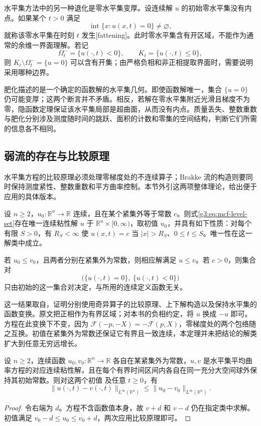 水平集方法中的另一种退化是零水平集变厚。设连续解 \(u\) 的初始零水平集没有内点。如果某个 \(t>0\) 满足
\[
\operatorname{int}\{x:u(x,t)=0\}\ne\varnothing,
\]
就称该零水平集在时刻 \(t\) 发生[fattening]。此时零水平集含有开区域，不能作为通常的余维一界面理解。若记
\[
\Omega_t^- =\{u(\cdot,t)<0\},\qquad K_t=\{u(\cdot,t)\le0\},
\]
则 \(K_t\setminus\Omega_t^-=\{u=0\}\) 可以含有开集；由严格负相和非正相提取界面时，需要说明采用哪种边界。

\ProseParagraphBreak
肥化描述的是一个确定的函数解的水平集几何。即使函数解唯一，集合 \(\{u=0\}\) 仍可能变厚；这两个断言并不矛盾。相反，若解在零水平集附近光滑且梯度不为零，隐函数定理保证该水平集局部是超曲面，从而没有内点。质量丢失、整数重数与肥化分别涉及测度随时间的跳跃、面积的计数和零集的空间结构，判断它们所需的信息各不相同。

\subsection{弱流的存在与比较原理}
\label{g3:subsec:2804:04}
水平集方程的比较原理必须处理零梯度处的不连续算子；Brakke 流的构造则要同时保持测度紧性、整数重数和平方曲率控制。本节外引这两项整体理论，给出便于应用的具体版本。

\begin{theorem}\label{g3:thm:level-set-global-external}
	设 \(n\ge2\)，\(u_0:\mathbb R^n\to\mathbb R\) 连续，且在某个紧集外等于常数 \(c\)。则式\eqref{g3:eq:mcf-level-set}存在唯一连续粘性解 \(u\) 于 \(\mathbb R^n\times[0,\infty)\)，取初值 \(u_0\)，并具有如下性质：对每个有限 \(S>0\)，有 \(R_S<\infty\) 使 \(u(x,t)=c\) 当 \(|x|>R_S\)、\(0\le t\le S\)。唯一性在这一解类中成立。

	若 \(u_0\le v_0\)，且两者分别在紧集外为常数，则相应解满足 \(u\le v\)。若 \(c>0\)，则集合对
	\[
	\bigl(\{u(\cdot,t)=0\},\ \{u(\cdot,t)<0\}\bigr)
	\]
	只由初始的这一集合对决定，与所用的连续定义函数无关。
\end{theorem}

这一结果取自\cite[定理6.7、6.8及注6.9，第780--781页；定理7.1，第782--783页]{ChenGigaGoto1991MeanCurvature}，证明分别使用奇异算子的比较原理、上下解构造以及保持水平集的函数变换。原文把正相作为有界区域；对本书的负相约定，将 \(u\) 换成 \(-u\) 即可。方程在此变换下不变，因为 \(\mathcal F(-p,-X)=-\mathcal F(p,X)\)，零梯度处的两个包络随之互换。初值在紧集外为常数还保证它有界且一致连续，本定理并未把结论的解类扩大到任意无穷远增长。

\begin{corollary}\label{g3:cor:level-set-contraction}
	设 \(n\ge2\)，连续函数 \(u_0,v_0:\mathbb R^n\to\mathbb R\) 各自在某紧集外为常数，\(u,v\) 是水平集平均曲率方程的对应连续粘性解，且在每个有界时间区间内各自在同一充分大空间球外保持其初始常数。则对这两个初值 及任意 \(t\ge0\)，有
	\[
	\|u(\cdot,t)-v(\cdot,t)\|_{L^\infty(\mathbb R^n)}
	\le\|u_0-v_0\|_{L^\infty(\mathbb R^n)}.
	\]
\end{corollary}
\begin{proof}
	令右端为 \(d\)。方程不含函数值本身，故 \(v+d\) 和 \(v-d\) 仍在指定类中求解。初值满足 \(v_0-d\le u_0\le v_0+d\)，两次应用比较原理即可。
\end{proof}

